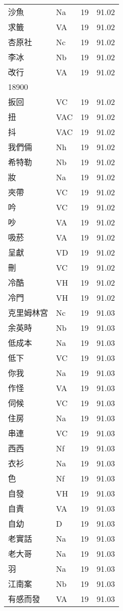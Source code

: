 \documentclass[twocolumn]{book}
\begin{document}
\begin{supertabular}{llrr}
沙魚 & Na & 19 &  91.02\\
求籤 & VA & 19 &  91.02\\
杏原社 & Nc & 19 &  91.02\\
李冰 & Nb & 19 &  91.02\\
改行 & VA & 19 &  91.02\\
18900\\
扳回 & VC & 19 &  91.02\\
扭 & VAC & 19 &  91.02\\
抖 & VAC & 19 &  91.02\\
我們倆 & Nh & 19 &  91.02\\
希特勒 & Nb & 19 &  91.02\\
妝 & Na & 19 &  91.02\\
夾帶 & VC & 19 &  91.02\\
吟 & VC & 19 &  91.02\\
吵 & VA & 19 &  91.02\\
吸菸 & VA & 19 &  91.02\\
呈獻 & VD & 19 &  91.02\\
刪 & VC & 19 &  91.02\\
冷酷 & VH & 19 &  91.02\\
冷門 & VH & 19 &  91.02\\
克里姆林宮 & Nc & 19 &  91.03\\
余英時 & Nb & 19 &  91.03\\
低成本 & Na & 19 &  91.03\\
低下 & VC & 19 &  91.03\\
你我 & Na & 19 &  91.03\\
作怪 & VA & 19 &  91.03\\
伺候 & VC & 19 &  91.03\\
住房 & Na & 19 &  91.03\\
串連 & VC & 19 &  91.03\\
西西 & Nf & 19 &  91.03\\
衣衫 & Na & 19 &  91.03\\
色 & Nf & 19 &  91.03\\
自發 & VH & 19 &  91.03\\
自責 & VA & 19 &  91.03\\
自幼 & D & 19 &  91.03\\
老實話 & Na & 19 &  91.03\\
老大哥 & Na & 19 &  91.03\\
羽 & Na & 19 &  91.03\\
江南案 & Nb & 19 &  91.03\\
有感而發 & VA & 19 &  91.03\\

\end{supertabular}
\end{document}
